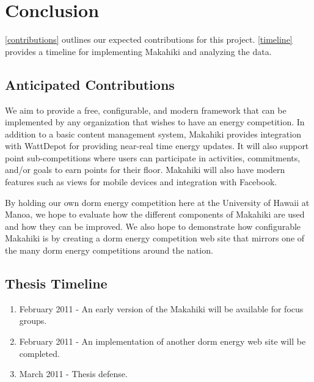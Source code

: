 \chapter{Conclusion}
\label{conclusion}

\autoref{contributions} outlines our expected contributions for this project.  \autoref{timeline} provides a timeline for implementing Makahiki and analyzing the data.

\section{Anticipated Contributions}
\label{contributions}

We aim to provide a free, configurable, and modern framework that can be implemented by any organization that wishes to have an energy competition.  In addition to a basic content management system, Makahiki provides integration with WattDepot for providing near-real time energy updates.  It will also support point sub-competitions where users can participate in activities, commitments, and/or goals to earn points for their floor.  Makahiki will also have modern features such as views for mobile devices and integration with Facebook.

By holding our own dorm energy competition here at the University of Hawaii at Manoa, we hope to evaluate how the different components of Makahiki are used and how they can be improved.  We also hope to demonstrate how configurable Makahiki is by creating a dorm energy competition web site that mirrors one of the many dorm energy competitions around the nation.

\section{Thesis Timeline}
\label{timeline}

\begin{enumerate}
\item February 2011 - An early version of the Makahiki will be available for focus groups.
\item February 2011 - An implementation of another dorm energy web site will be completed.
\item March 2011 - Thesis defense.
\end{enumerate}